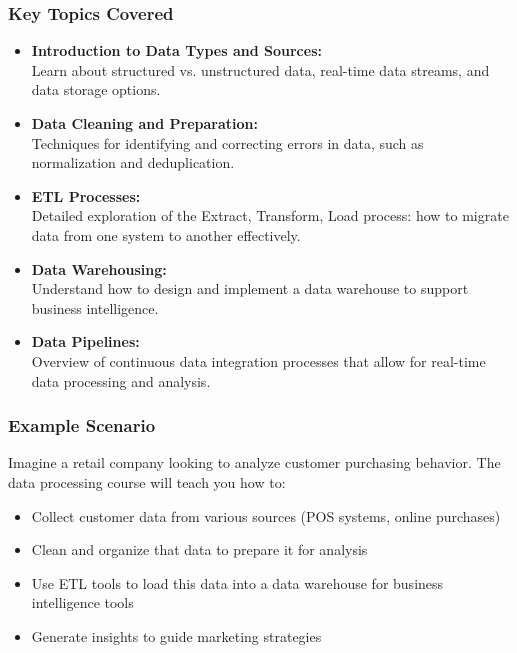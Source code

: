 \documentclass{beamer}
\begin{document}
\begin{frame}[fragile]
    \frametitle{Key Topics Covered}
    \begin{itemize}
        \item \textbf{Introduction to Data Types and Sources:} \\
        Learn about structured vs. unstructured data, real-time data streams, and data storage options.
        
        \item \textbf{Data Cleaning and Preparation:} \\
        Techniques for identifying and correcting errors in data, such as normalization and deduplication.
        
        \item \textbf{ETL Processes:} \\
        Detailed exploration of the Extract, Transform, Load process: how to migrate data from one system to another effectively.
        
        \item \textbf{Data Warehousing:} \\
        Understand how to design and implement a data warehouse to support business intelligence.
        
        \item \textbf{Data Pipelines:} \\
        Overview of continuous data integration processes that allow for real-time data processing and analysis.
    \end{itemize}
\end{frame}

\begin{frame}[fragile]
    \frametitle{Example Scenario}
    Imagine a retail company looking to analyze customer purchasing behavior. The data processing course will teach you how to:
    \begin{itemize}
        \item Collect customer data from various sources (POS systems, online purchases)
        \item Clean and organize that data to prepare it for analysis
        \item Use ETL tools to load this data into a data warehouse for business intelligence tools
        \item Generate insights to guide marketing strategies
    \end{itemize}
\end{frame}
\end{document}
